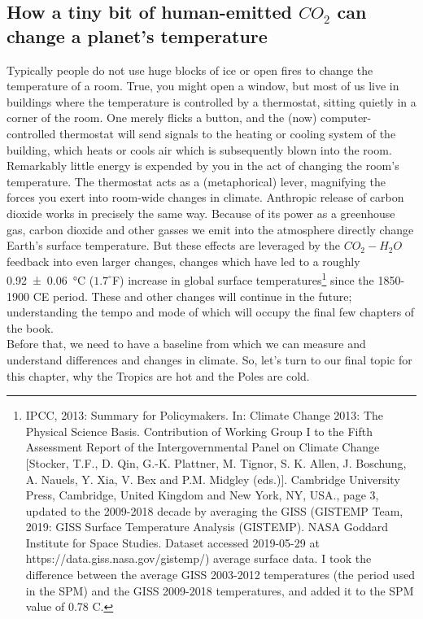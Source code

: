 \documentclass[amstex,12pt]{book}
\begin{document}
\subsection{How a tiny bit of human-emitted $CO_2$ can change a planet's temperature}
Typically people do not use huge blocks of ice or open fires to change the temperature of a room. True, you might open a window, but most of us live in buildings where the temperature is controlled by a thermostat, sitting quietly in a corner of the room. One merely flicks a button, and the (now) computer-controlled thermostat will send signals to the heating or cooling system of the building, which heats or cools air which is subsequently blown into the room. Remarkably little energy is expended by you in the act of changing the room's temperature. The thermostat acts as a (metaphorical) lever, magnifying the forces you exert into room-wide changes in climate. Anthropic release of carbon dioxide works in precisely the same way. Because of its power as a greenhouse gas, carbon dioxide and other gasses we emit into the atmosphere directly change Earth's surface temperature. But these effects are leveraged by the $CO_2-H_2O$ feedback into even larger changes, changes which have led to a roughly \SI[separate-uncertainty]{0.92(6)}{\celsius} ($1.7^{\circ}$F) increase in global surface temperatures\footnote{IPCC, 2013: Summary for Policymakers. In: Climate Change 2013: The Physical Science Basis. Contribution of Working Group I to the Fifth Assessment Report of the Intergovernmental Panel on Climate Change [Stocker, T.F., D. Qin, G.-K. Plattner, M. Tignor, S. K. Allen, J. Boschung, A. Nauels, Y. Xia, V. Bex and P.M. Midgley (eds.)]. Cambridge University Press, Cambridge, United Kingdom and New York, NY, USA., page 3, updated to the 2009-2018 decade by averaging the GISS (GISTEMP Team, 2019: GISS Surface Temperature Analysis (GISTEMP). NASA Goddard Institute for Space Studies. Dataset accessed 2019-05-29 at https://data.giss.nasa.gov/gistemp/) average surface data. I took the difference between the average GISS 2003-2012 temperatures (the period used in the SPM) and the GISS 2009-2018 temperatures, and added it to the SPM value of 0.78 C.} since the 1850-1900 CE period. These and other changes will continue in the future; understanding the tempo and mode of which will occupy the final few chapters of the book.\\

Before that, we need to have a baseline from which we can measure and understand differences and changes in climate. So, let's turn to our final topic for this chapter, why the Tropics are hot and the Poles are cold.
\end{document}
